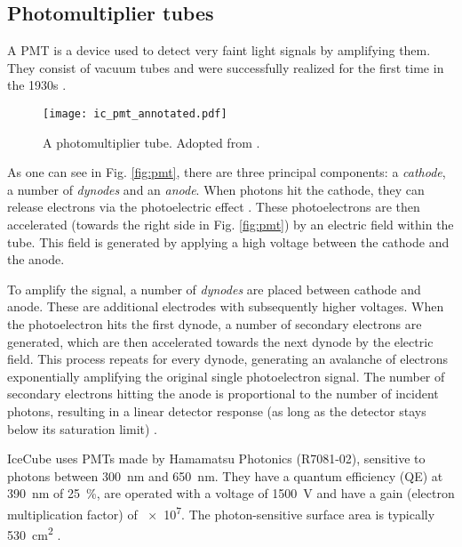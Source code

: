 \subsection{Photomultiplier tubes}
A PMT is a device used to detect very faint light signals by amplifying them. They consist of vacuum tubes and were successfully realized for the first time in the 1930s .

\begin{figure}[h!]
    \texttt{[image: ic\_pmt\_annotated.pdf]}
    \caption[PMT schematic]{A photomultiplier tube. Adopted from \cite{Bednarski2014}.}
\end{figure}

As one can see in Fig. \ref{fig:pmt}, there are three principal components: a \textit{cathode}, a number of \textit{dynodes} and an \textit{anode}. When photons hit the cathode, they can release electrons via the photoelectric effect . These photoelectrons are then accelerated (towards the right side in Fig. \ref{fig:pmt}) by an electric field within the tube. This field is generated by applying a high voltage between the cathode and the anode.

To amplify the signal, a number of \textit{dynodes} are placed between cathode and anode. These are additional electrodes with subsequently higher voltages. When the photoelectron hits the first dynode, a number of secondary electrons are generated, which are then accelerated towards the next dynode by the electric field. This process repeats for every dynode, generating an avalanche of electrons exponentially amplifying the original single photoelectron signal. The number of secondary electrons hitting the anode is proportional to the number of incident photons, resulting in a linear detector response (as long as the detector stays below its saturation limit) .

IceCube uses PMTs made by Hamamatsu Photonics (R7081-02), sensitive to photons between \SI{300}{\nm} and \SI{650}{\nm}. They have a quantum efficiency (QE) at \SI{390}{\nm} of \SI{25}{\percent}, are operated with a voltage of \SI{1500}{\V} and have a gain (electron multiplication factor) of \num{e7}. The photon-sensitive surface area is typically \SI{530}{\cm\squared} .

